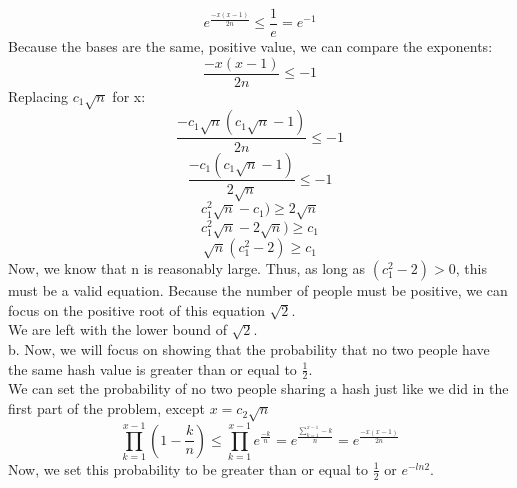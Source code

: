 \documentclass[11pt, solution, letterpaper]{format}
\begin{document}
\begin{equation*}
  e^{\frac{-x(x-1)}{2n}}
  \leq  \frac{1}{e}
  = e^{-1}
\end{equation*}
Because the bases are the same, positive value, we can compare the exponents:
\begin{equation*}
  \frac{-x(x-1)}{2n}
  \leq -1
\end{equation*}
Replacing $c_1\sqrt{n}$ for x:
\begin{equation*}
  \frac{-c_1\sqrt{n}(c_1\sqrt{n} - 1)}{2n}
  \leq -1
\end{equation*}
\begin{equation*}
  \frac{-c_1(c_1\sqrt{n} - 1)}{2\sqrt{n}}
  \leq -1
\end{equation*}
\begin{equation*}
  c_1^2\sqrt{n} - c_1)
  \geq 2\sqrt{n}
\end{equation*}
\begin{equation*}
  c_1^2\sqrt{n} - 2\sqrt{n})
  \geq c_1
\end{equation*}
\begin{equation*}
  \sqrt{n}(c_1^2 - 2)
  \geq c_1
\end{equation*}
Now, we know that n is reasonably large. Thus, as long as $(c_1^2 - 2) > 0$, this must be a valid equation. Because the number of people must be positive, we can focus on the positive root of this equation $\sqrt{2}$. \\We are left with the lower bound of $\sqrt{2}$. \\
\clearpage
b. Now, we will focus on showing that the probability that no two people have the same hash value is greater than or equal to $\frac{1}{2}$. \\
We can set the probability of no two people sharing a hash just like we did in the first part of the problem, except $x = c_2\sqrt{n}$
\begin{equation*}
  \prod_{k=1}^{x - 1} (1 - \frac{k}{n}) 
  \leq  \prod_{k=1}^{x - 1} e^{\frac{-k}{n}}
  = e^{\frac{\sum_{k=1}^{x - 1} -k}{n}}
  = e^{\frac{-x(x-1)}{2n}}
\end{equation*}
Now, we set this probability to be greater than or equal to $\frac{1}{2}$ or $e^{-ln2}$.
\end{document}
